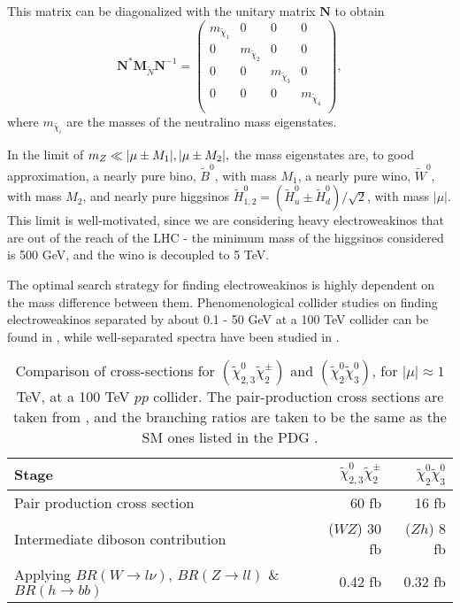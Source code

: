 This matrix can be diagonalized with the unitary matrix $\mathbf{N}$ to obtain 
\[\mathbf{N}^*\mathbf{M}_{\widetilde{N}}\mathbf{N}^{-1} =
\begin{pmatrix}
  m_{\widetilde{\chi}_1} & 0 & 0 & 0\\
  0 & m_{\widetilde{\chi}_2} & 0 & 0 \\
  0 & 0 & m_{\widetilde{\chi}_3} & 0 \\
  0 & 0 & 0 &  m_{\widetilde{\chi}_4} \\
\end{pmatrix},
\]
where $m_{\widetilde{\chi_i}}$ are the masses of the neutralino mass eigenstates. 

In the limit of $m_Z \ll |\mu\pm M_1|, |\mu\pm M_2|,$ the mass eigenstates are, to good approximation, a nearly pure bino, $\widetilde{B}^0$, with mass $M_1$, a nearly pure wino, $\widetilde{W}^0$, with mass $M_2$, and nearly pure higgsinos $\widetilde{H}^0_{1,2} = (\widetilde{H}_u^0 \pm \widetilde{H}_d^0)/\sqrt{2}$, with mass $|\mu|$. This limit is well-motivated, since we are considering heavy electroweakinos that are out of the reach of the LHC - the minimum mass of the higgsinos considered is 500 GeV, and the wino is decoupled to 5 TeV. 

The optimal search strategy for finding electroweakinos is highly dependent on the mass difference between them. Phenomenological collider studies on finding electroweakinos separated by about 0.1 - 50 GeV at a 100 TeV collider can be found in \citep{Low2014, Plehn2015, Berlin2015, Cirelli2014}, while well-separated spectra have been studied in \citep{Gori:2014oua, Acharya2014}.

\begin{table}
\centering
\begin{tabular}{lrr}
\toprule
Stage & $\widetilde{\chi}_{2,3}^0\widetilde{\chi}^\pm_{2}$ & $\widetilde{\chi}^0_{2}\widetilde{\chi}^0_{3}$\\
\midrule
Pair production cross section & 60 fb & 16 fb\\
Intermediate diboson contribution & ($WZ$) 30 fb  & ($Zh$) 8 fb \\
Applying $BR(W\rightarrow l\nu)$, $BR(Z\rightarrow ll)$ \& $BR(h\rightarrow bb)$ & 0.42 fb & 0.32 fb\\
\bottomrule
\end{tabular}
\caption{Comparison of cross-sections for $(\widetilde{\chi}_{2,3}^0\widetilde{\chi}^\pm_{2})$ and $(\widetilde{\chi}^0_{2}\widetilde{\chi}^0_{3})$, for $|\mu|\approx 1$ TeV, at a 100 TeV $pp$ collider. The pair-production cross sections are taken from \citep{Gori:2014oua}, and the branching ratios are taken to be the same as the SM ones listed in the PDG \citep{Olive2016}.}
\label{tab:xsections}
\end{table}

